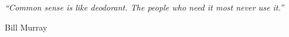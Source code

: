 \pagestyle{empty}

\null\vfill

\textit{``Common sense is like deodorant. The people who need it most never use it.''}

\begin{flushright}
Bill Murray
\end{flushright}

\vfill\vfill\vfill\vfill\vfill\vfill\null
\clearpage
